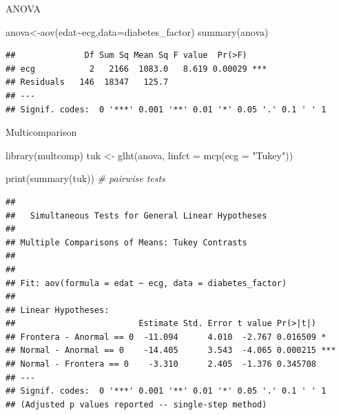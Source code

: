 \documentclass[
  ignorenonframetext,
]{beamer}
\newenvironment{Shaded}{\begin{snugshade}}{\end{snugshade}}
\newcommand{\AttributeTok}[1]{\textcolor[rgb]{0.77,0.63,0.00}{#1}}
\newcommand{\CommentTok}[1]{\textcolor[rgb]{0.56,0.35,0.01}{\textit{#1}}}
\newcommand{\FunctionTok}[1]{\textcolor[rgb]{0.00,0.00,0.00}{#1}}
\newcommand{\NormalTok}[1]{#1}
\newcommand{\OtherTok}[1]{\textcolor[rgb]{0.56,0.35,0.01}{#1}}
\newcommand{\SpecialCharTok}[1]{\textcolor[rgb]{0.00,0.00,0.00}{#1}}
\newcommand{\StringTok}[1]{\textcolor[rgb]{0.31,0.60,0.02}{#1}}
\begin{document}
\begin{frame}[fragile]{ANOVA}
\protect\hypertarget{anova}{}
\begin{Shaded}
\begin{Highlighting}[]
\NormalTok{anova}\OtherTok{\textless{}{-}}\FunctionTok{aov}\NormalTok{(edat}\SpecialCharTok{\textasciitilde{}}\NormalTok{ecg,}\AttributeTok{data=}\NormalTok{diabetes\_factor)}
\FunctionTok{summary}\NormalTok{(anova)}
\end{Highlighting}
\end{Shaded}

\begin{verbatim}
##              Df Sum Sq Mean Sq F value  Pr(>F)    
## ecg           2   2166  1083.0   8.619 0.00029 ***
## Residuals   146  18347   125.7                    
## ---
## Signif. codes:  0 '***' 0.001 '**' 0.01 '*' 0.05 '.' 0.1 ' ' 1
\end{verbatim}
\end{frame}

\begin{frame}[fragile]{Multicomparison}
\protect\hypertarget{multicomparison}{}
\tiny

\begin{Shaded}
\begin{Highlighting}[]
\FunctionTok{library}\NormalTok{(multcomp)}
\NormalTok{tuk }\OtherTok{\textless{}{-}} \FunctionTok{glht}\NormalTok{(anova, }\AttributeTok{linfct =} \FunctionTok{mcp}\NormalTok{(}\AttributeTok{ecg =} \StringTok{"Tukey"}\NormalTok{))}

  \FunctionTok{print}\NormalTok{(}\FunctionTok{summary}\NormalTok{(tuk)) }\CommentTok{\# pairwise tests}
\end{Highlighting}
\end{Shaded}

\begin{verbatim}
## 
##   Simultaneous Tests for General Linear Hypotheses
## 
## Multiple Comparisons of Means: Tukey Contrasts
## 
## 
## Fit: aov(formula = edat ~ ecg, data = diabetes_factor)
## 
## Linear Hypotheses:
##                         Estimate Std. Error t value Pr(>|t|)    
## Frontera - Anormal == 0  -11.094      4.010  -2.767 0.016509 *  
## Normal - Anormal == 0    -14.405      3.543  -4.065 0.000215 ***
## Normal - Frontera == 0    -3.310      2.405  -1.376 0.345708    
## ---
## Signif. codes:  0 '***' 0.001 '**' 0.01 '*' 0.05 '.' 0.1 ' ' 1
## (Adjusted p values reported -- single-step method)
\end{verbatim}
\end{frame}
\end{document}
